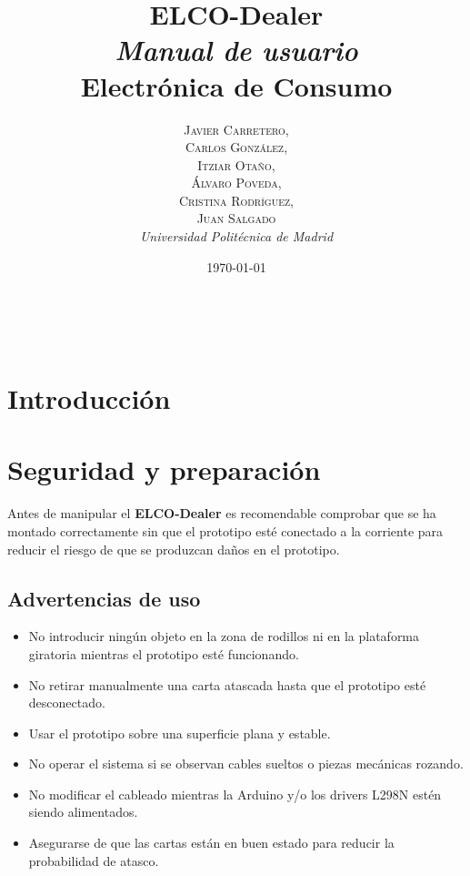 \documentclass[a4paper, 11pt]{article}
\title{\textbf{ELCO-Dealer}
\\
\textit{Manual de usuario} \\ 
\vspace{0.35cm}
Electrónica de Consumo}
\author{
\textsc{
Javier Carretero,\\
Carlos González,\\
Itziar Otaño,\\
Álvaro Poveda,\\
Cristina Rodríguez,\\
Juan Salgado
}\\[4pt]
\textit{Universidad Politécnica de Madrid}
}
\date{\today}
\makeatletter
\renewcommand{\maketitle}{
  \begin{flushright}
    {\LARGE\@title}

    \vspace{50pt}

    {\large\@author}\\
    \@date

    \vspace{40pt}
  \end{flushright}
}
\makeatother
\begin{document}
\hypersetup{pageanchor=false}


\begin{titlepage}
\thispagestyle{portada}

\maketitle

\end{titlepage}

\clearpage
\hypersetup{pageanchor=true}
\setcounter{page}{1}


\tableofcontents
\newpage

\section{Introducción}


\section{Seguridad y preparación}

Antes de manipular el \textbf{ELCO-Dealer} es recomendable comprobar que se ha montado correctamente sin que el prototipo esté conectado a la corriente para reducir el riesgo de que se produzcan daños en el prototipo.

\subsection{Advertencias de uso}

\begin{itemize}
    \item No introducir ningún objeto en la zona de rodillos ni en la plataforma giratoria mientras el prototipo esté funcionando.
    \item No retirar manualmente una carta atascada hasta que el prototipo esté desconectado.
    \item Usar el prototipo sobre una superficie plana y estable.
    \item No operar el sistema si se observan cables sueltos o piezas mecánicas rozando.
    \item No modificar el cableado mientras la Arduino y/o los drivers L298N estén siendo alimentados.
    \item Asegurarse de que las cartas están en buen estado para reducir la probabilidad de atasco.   
\end{itemize}
\end{document}
